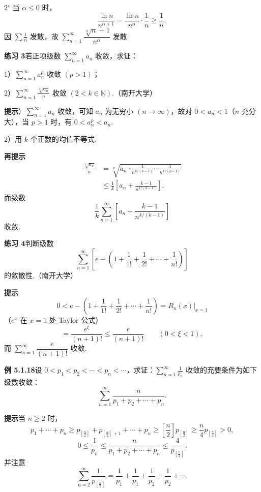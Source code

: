 \documentclass[UTF8,12pt,a4paper,fontset=fandol]{ctexart}
\begin{document}
$2^\circ$ 当 $\alpha\le0$ 时，
\[
  \frac{\ln n}{n^{\alpha+1}}=\frac{\ln n}{n^\alpha}\cdot\frac1n\ge\frac1n,
\]
因 $\displaystyle\sum\frac1n$ 发散，故 $\displaystyle\sum_{n=1}^\infty\dfrac{\sqrt[n]{n}-1}{n^\alpha}$ 发散.

\noindent\textbf{练习 3}\quad 若正项级数 $\displaystyle\sum_{n=1}^\infty a_n$ 收敛，求证：

1）$\displaystyle\sum_{n=1}^\infty a_n^p$ 收敛 $(p>1)$；

2）$\displaystyle\sum_{n=1}^\infty\frac{\sqrt[k]{a_n}}n$ 收敛 $(2<k\in\mathbb{N})$.（南开大学）

\noindent\textbf{提示}）$\displaystyle\sum_{n=1}^\infty a_n$ 收敛，可知 $a_n$ 为无穷小 $(n\to\infty)$，故对 $0<a_n<1$（$n$ 充分大），当 $p>1$ 时，有 $0<a_n^p<a_n$.

2）用 $k$ 个正数的均值不等式.

\noindent\textbf{再提示}\quad
\[
\begin{aligned}
\frac{\sqrt[k]{a_n}}n
&=\sqrt[k]{a_n\cdot
\frac1{n^{k/(k-1)}}\cdots\frac1{n^{k/(k-1)}}}\\
&\le\frac1k\left[a_n+\frac{k-1}{n^{k/(k-1)}}\right].
\end{aligned}
\]
而级数
\[
  \frac1k\sum_{n=1}^\infty\left[a_n+\frac{k-1}{n^{k/(k-1)}}\right]
\]
收敛.

\noindent\textbf{练习 4}\quad 判断级数
\[
  \sum_{n=1}^\infty\left[e-\left(1+\frac1{1!}+\frac1{2!}+\cdots+\frac1{n!}\right)\right]
\]
的敛散性.（南开大学）

\noindent\textbf{提示}\quad
\[
  0<e-\left(1+\frac1{1!}+\frac1{2!}+\cdots+\frac1{n!}\right)
  =R_n(x)\big|_{x=1}
\]
（$e^x$ 在 $x=1$ 处 Taylor 公式）
\[
  =\frac{e^\xi}{(n+1)!}\le\frac e{(n+1)!}\qquad(0<\xi<1),
\]
而 $\displaystyle\sum_{n=1}^\infty\dfrac e{(n+1)!}$ 收敛.

\noindent\textbf{例 5.1.18}\quad 设 $0<p_1<p_2<\cdots<p_n<\cdots$，求证：$\displaystyle\sum_{n=1}^\infty\frac1{p_n}$ 收敛的充要条件为如下级数收敛：
\[
  \sum_{n=1}^\infty\frac{n}{p_1+p_2+\cdots+p_n}.
\]

\noindent\textbf{提示}\quad 当 $n\ge2$ 时，
\[
  p_1+\cdots+p_n
  \ge p_{\left[\frac n2\right]}+p_{\left[\frac n2\right]+1}+\cdots+p_n
  \ge\left[\frac n2\right]p_{\left[\frac n2\right]}
  \ge\frac n4p_{\left[\frac n2\right]}>0,
\]
\[
  0\le\frac1{p_n}\le
  \frac{n}{p_1+p_2+\cdots+p_n}\le
  \frac4{p_{\left[\frac n2\right]}}.
\]
并注意
\[
  \sum_{n=2}^\infty\frac1{p_{\left[\frac n2\right]}}
  =\frac1{p_1}+\frac1{p_1}+\frac1{p_2}+\frac1{p_2}+\cdots.
\]
\end{document}
